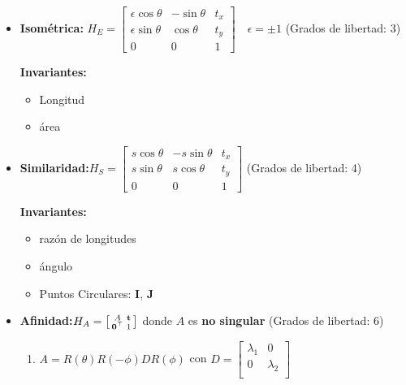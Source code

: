 \documentclass[12pt,a4paper]{article}
\begin{document}
\begin{itemize}
	\item {\bf Isom\'etrica:} $
	H_{E} =
	\left[ {\begin{smallmatrix}
	 \epsilon \cos \theta & -\sin \theta& t_{x} \\
	 \epsilon \sin \theta & \cos \theta& t_{y} \\
	 0 & 0 & 1
	\end{smallmatrix} } \right]
	\quad \epsilon = \pm 1$	\hspace*{1cm}(Grados de libertad: 3)
	
	{\bf Invariantes:} 
	\begin{itemize}
		\item Longitud
		\item \'area
	\end{itemize}

	\item {\bf Similaridad:}$
	H_{S} =
	\left[ {\begin{smallmatrix}
	 s \cos \theta & - s \sin \theta& t_{x} \\
	 s \sin \theta & s\cos \theta& t_{y} \\
	 0 & 0 & 1
	\end{smallmatrix} } \right]
	$ \hspace*{1cm}(Grados de libertad: 4)
	
	{\bf Invariantes:} 
	\begin{itemize}
		\item raz\'on de longitudes
		\item \'angulo
		\item Puntos Circulares: {\bf I}, {\bf J}
	\end{itemize}

	\item {\bf Afinidad:}$
	H_{A} =
	\left[ {\begin{smallmatrix}
	 A & {\bf t}\\
	 {\bf 0}^{\top} & 1 \\
	\end{smallmatrix} } \right]
	$ donde $A$ es {\bf no singular}  \hspace*{1cm}(Grados de libertad: 6)

	\begin{enumerate}
		\item $A = R(\theta)R(-\phi)DR(\phi)$ con $D = \left[ {\begin{smallmatrix}
		 \lambda_{1} & 0\\
		 0 & \lambda_{2}\\
		\end{smallmatrix} } \right]$


\end{enumerate}
\end{itemize}
\end{document}
